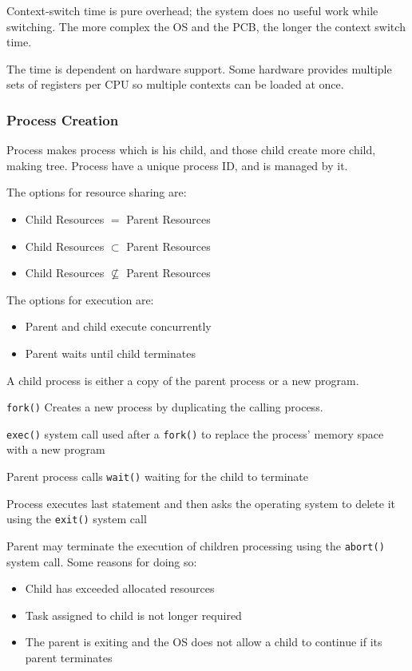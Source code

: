 \documentclass[]{article}
\begin{document}
Context-switch time is pure overhead; the system does no useful work while switching. The more complex the OS and the PCB, the longer the context switch time.


The time is dependent on hardware support. Some hardware provides multiple sets of registers per CPU so multiple contexts can be loaded at once.

\subsubsection*{Process Creation}

Process makes process which is his child, and those child create more child, making tree.
Process have a unique process ID, and is managed by it.

The options for resource sharing are:
\begin{itemize}
    \item Child Resources $=$ Parent Resources
    \item Child Resources $\subset$ Parent Resources
    \item Child Resources $\nsubseteq$ Parent Resources 
\end{itemize}

The options for execution are:
\begin{itemize}
    \item Parent and child execute concurrently
    \item Parent waits until child terminates
\end{itemize}

A child process is either a copy of the parent process or a new program.

\verb|fork()| Creates a new process by duplicating the calling process. 

\verb|exec()| system call used after a \verb|fork()| to replace the process’ memory space with a new program

Parent process calls \verb|wait()| waiting for the child to terminate

Process executes last statement and then asks the operating system to delete it using the \verb|exit()| system call

Parent may terminate the execution of children processing using the \verb|abort()| system call. Some reasons for doing so:

\begin{itemize}
    \item Child has exceeded allocated resources
    \item Task assigned to child is not longer required
    \item The parent is exiting and the OS does not allow a child to continue if its parent terminates
\end{itemize}
\end{document}

